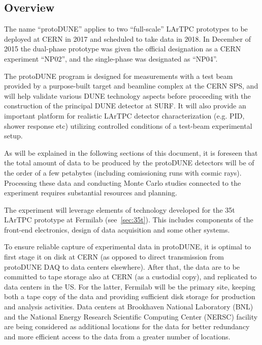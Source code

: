 \label{sec:protodune}
\subsection{Overview}

The name ``protoDUNE'' applies to two ``full-scale'' LArTPC prototypes to be deployed at CERN in 2017 and scheduled
to take data in 2018. In December of 2015 the dual-phase prototype was given the official designation as a CERN experiment ``NP02'',
and the single-phase was designated as ``NP04''.

The protoDUNE program is designed for measurements with a test beam provided by a purpose-built target and beamline complex at the
CERN SPS, and will help validate various DUNE technology aspects before proceeding with the construction of the principal DUNE detector
at SURF. It will also provide an important platform for realistic LArTPC detector characterization (e.g. PID, shower response etc) utilizing
controlled conditions of a test-beam experimental setup.

As will be explained in the following sections of this document, it is foreseen that the total amount of data to be produced
by the protoDUNE detectors will be of the order of a few petabytes (including comissioning runs with cosmic rays). Processing
these data and conducting Monte Carlo studies connected to the experiment requires substantial resources and planning.

The experiment will leverage elements of technology developed for the 35t LArTPC prototype at Fermilab (see~\ref{sec:35t}).
This includes components of the front-end electronics, design of data acquisition and some other systems.

To ensure reliable capture of experimental data in protoDUNE, it is optimal to first stage it on disk at CERN (as opposed to direct transmission
from protoDUNE DAQ to data centers elsewhere). After that, the data are to be committed to tape storage also at CERN (as a custodial copy),
and replicated to data centers in the US. For the latter, Fermilab will be the primary site, keeping both a tape copy of the data and providing
sufficient disk storage for production and analysis activities. Data centers at Brookhaven National Laboratory (BNL) and the
National Energy Research Scientific Computing Center (NERSC) facility are being considered as additional locations for the data
for better redundancy and more efficient access to the data from a greater number of locations.


